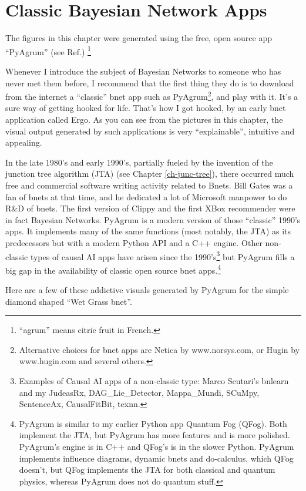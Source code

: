 \chapter{Classic Bayesian Network Apps}
\label{ch-bnet-apps}

The figures in this chapter were generated using
the free, open source app \enquote{PyAgrum} (see Ref.\cite{pyagrum})
\footnote{\enquote{agrum} means citric fruit in French. }


Whenever I introduce the subject of Bayesian Networks
to someone who has never met them before, I recommend that the first thing they do is to
download from the internet a \enquote{classic} bnet app  such as
PyAgrum\footnote{Alternative choices for bnet apps are Netica by www.norsys.com, or Hugin by www.hugin.com and several others.}, and play with it. It's a sure way of getting hooked
for life. That's how I got hooked, by an early bnet application called Ergo. As you can see from the pictures in this chapter,
the visual output generated by such applications is very \enquote{explainable},
 intuitive and appealing.

  
In the late 1980's and early 1990's, partially fueled by the invention of
the junction tree algorithm (JTA) (see Chapter \ref{ch-junc-tree}), there
occurred much free and commercial software writing activity related to Bnets. Bill Gates was a fan of bnets at that time, and he dedicated a lot of Microsoft manpower to do R\&D of bnets. The first version of Clippy and the first XBox recommender were in fact Bayesian Networks. PyAgrum is a modern version of those \enquote{classic} 1990's apps. It implements many of the same functions (most notably, the JTA) as its predecessors but with a modern Python API and a C++ engine. Other non-classic types of causal AI apps have arisen since the 1990's\footnote{Examples of Causal AI apps of a non-classic type:  Marco Scutari's bnlearn and my JudeasRx, DAG\_Lie\_Detector, Mappa\_Mundi, SCuMpy, SentenceAx, CausalFitBit, texnn.} but PyAgrum fills a big gap in the availability of classic open source bnet apps.\footnote{PyAgrum is similar to my earlier Python app Quantum Fog (QFog). Both implement the JTA, but PyAgrum  has more features and is more polished.
PyAgrum's engine is in C++ and QFog's is in the slower Python.  PyAgrum implements influence diagrams, dynamic bnets
and do-calculus, which QFog doesn't, but QFog implements the JTA for both classical and quantum physics, whereas PyAgrum does not do quantum stuff.}

Here are a few of these addictive visuals generated by PyAgrum
for the simple diamond shaped  \enquote{Wet Grass bnet}.

